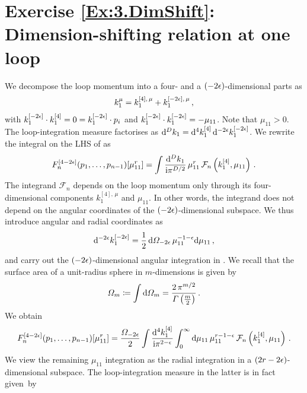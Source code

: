 
\section*{Exercise \ref{Ex:3.DimShift}: Dimension-shifting relation at one loop}
\label{Sol:3.DimShift}
%
We decompose the loop momentum into a four- and a $(-2\epsilon)$-dimensional parts as
\begin{align}
k_1^{\mu} = k_1^{[4], \, \mu} + k_1^{[-2\epsilon], \, \mu} \,,
\end{align}
with $k_1^{[-2\epsilon]} \cdot k_1^{[4]} = 0 = k_1^{[-2\epsilon]} \cdot p_i$ and $ k_1^{[-2\epsilon]} \cdot k_1^{[-2\epsilon]} = - \mu_{11}$. Note that $\mu_{11} > 0$.
The loop-integration measure factorises as $\mathrm{d}^D k_1 = \mathrm{d}^4 k_1^{[4]} \, \mathrm{d}^{-2\epsilon} k_1^{[-2\epsilon]}$.
We rewrite the integral on the LHS of  as
\begin{align} \label{eq:dimshift_eq1}
F^{[4-2\epsilon]}_n(p_1,\ldots,p_{n-1})[\mu_{11}^r] = \int \frac{\mathrm{d}^D k_1}{\mathrm{i} \pi^{D/2}} \, \mu_{11}^r \,  \mathcal{F}_n\left( k_1^{[4]}, \mu_{11} \right) \,.
\end{align}
The integrand $\mathcal{F}_n$ depends on the loop momentum only through its four-dimensional components $k_1^{[4], \, \mu}$ and $\mu_{11}$. In other words, the integrand does not depend on the angular coordinates of the $(-2\epsilon)$-dimensional subspace.
We thus introduce angular and radial coordinates as
\begin{align}
\d^{-2\eps} k_1^{[-2\eps]} = \frac{1}{2} \, \d \Omega_{-2\eps} \, \mu_{11}^{-1-\eps} \d \mu_{11} \,,
\end{align}
and carry out the $(-2\epsilon)$-dimensional angular integration in . We recall that the surface area of a unit-radius sphere in $m$-dimensions is given by
\begin{align} \label{eq:area-sphere}
\Omega_{m} \coloneqq \int \d \Omega_{m} = \frac{2 \, \pi^{m/2}}{\Gamma\left(\frac{m}{2}\right)} \,.
\end{align}
We obtain
\begin{align} \label{eq:dimshift_eq2}
F^{[4-2\eps]}_n(p_1,\ldots,p_{n-1})[\mu_{11}^r] = \frac{\Omega_{-2\eps}}{2} \int \frac{\d^4 k_1^{[4]}}{\i \pi^{2-\eps}} \int_{0}^{\infty} \d \mu_{11} \, \mu_{11}^{r-1-\eps} \, \mathcal{F}_n\left( k_1^{[4]}, \mu_{11} \right) \,.
\end{align}
We view the remaining $\mu_{11}$ integration as the radial integration in a $(2r-2\epsilon)$-dimensional subspace. The loop-integration measure in the latter is in fact given~by
